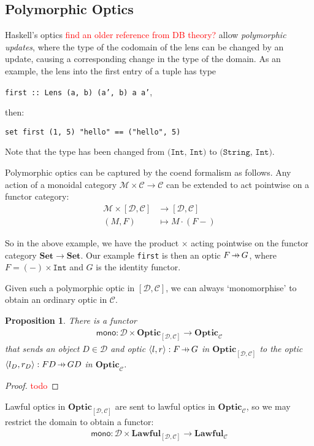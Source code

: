 \documentclass[11pt,a4paper]{article}
\theoremstyle{plain}
\newtheorem{proposition}[theorem]{Proposition}
\theoremstyle{definition}
\newcommand{\C}{\mathscr{C}}
\newcommand{\D}{\mathscr{D}}
\newcommand{\M}{\mathscr{M}}
\newcommand{\Set}{\mathbf{Set}}
\newcommand{\Optic}{\mathbf{Optic}}
\newcommand{\Lawful}{\mathbf{Lawful}}
\newcommand{\hto}{\ensuremath{\,\mathaccent\shortmid\rightarrow\,}}
\newcommand{\todo}[1]{\textcolor{red}{\small #1}}
\begin{document}
\subsection{Polymorphic Optics}
Haskell's optics \todo{find an older reference from DB theory?} allow \emph{polymorphic updates}, where the type of the codomain of the lens can be changed by an update, causing a corresponding change in the type of the domain. As an example, the lens into the first entry of a tuple has type
\begin{center}
\texttt{first :: Lens (a, b) (a', b) a a'}, 
\end{center}
then:
\begin{center}
\texttt{set first (1, 5) "hello" == ("hello", 5)}
\end{center}
Note that the type has been changed from $\texttt{(Int, Int)}$ to $\texttt{(String, Int)}$.

Polymorphic optics can be captured by the coend formalism as follows. Any action of a monoidal category $\M \times \C \to \C$ can be extended to act pointwise on a functor category:
\begin{align*}
\M \times [\D, \C] &\to [\D, \C] \\
(M, F) &\mapsto  M \cdot (F-)
\end{align*}

So in the above example, we have the product $\times$ acting pointwise on the functor category $\Set \to \Set$. Our example \texttt{first} is then an optic $F \hto G$, where $F = (-) \times \mathtt{Int}$ and $G$ is the identity functor.

Given such a polymorphic optic in $[\D, \C]$, we can always `monomorphise' to obtain an ordinary optic in $\C$.
\begin{proposition}
There is a functor 
\begin{align*}
\mathsf{mono} : \D \times \Optic_{[\D, \C]} \to \Optic_\C
\end{align*}
that sends an object $D \in \D$ and optic $\langle l, r \rangle : F \hto G$ in $\Optic_{[\D, \C]}$ to the optic $\langle l_D, r_D \rangle : FD \hto GD$ in $\Optic_\C$.
\end{proposition}
\begin{proof}
\todo{todo}
\end{proof}

Lawful optics in $\Optic_{[\D, \C]}$ are sent to lawful optics in $\Optic_\C$,  so we may restrict the domain to obtain a functor:
\begin{align*}
\mathsf{mono} : \D \times \Lawful_{[\D, \C]} \to \Lawful_\C
\end{align*}
\end{document}
